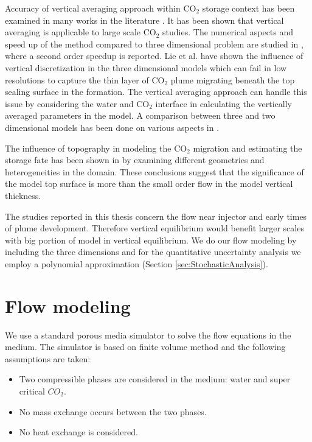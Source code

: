 Accuracy of vertical averaging approach within $\mbox{CO}_2$ storage context has
been
examined in many works in the literature
\cite{moll2011field,lie2010accurate,class2009benchmark,grayderivation}. It has
been shown that vertical averaging is applicable to large scale $\mbox{CO}_2$
studies. The numerical aspects and speed up of the method compared to three
dimensional problem are studied in
\cite{ligaarden2010numerical,grayderivation}, where a second order
speedup is reported. Lie et al. \cite{lie2010accurate} have shown the
influence of vertical discretization in the three dimensional models which can
fail in low resolutions to capture the thin layer of $\mbox{CO}_2$ plume
migrating beneath the top sealing surface in the formation. The vertical
averaging approach can handle this issue by considering the water and
$\mbox{CO}_2$ interface in calculating the vertically averaged parameters in the
model. A comparison between three and two dimensional models has been done on
various aspects in \cite{moll2011field}.

The influence of topography in modeling the $\mbox{CO}_2$ migration
and estimating the storage fate has been shown in
\cite{syversveenstudy,grayderivation} by examining different geometries and
heterogeneities in the domain. These conclusions suggest that the significance
of the model top surface is more than the small order flow in the model vertical
thickness.

The studies reported in this thesis concern the flow near injector and early
times of plume development. Therefore vertical equilibrium would benefit larger
scales with big portion of model in vertical equilibrium. We do our flow
modeling by including the three dimensions and for the quantitative uncertainty
analysis we employ a polynomial approximation (Section
\ref{sec:StochasticAnalysis}).

\section{Flow modeling}
\label{sec:FolowModeling}

We use a standard porous media simulator \cite{sis2007eclipse} to solve the flow equations in the
medium. The simulator is based on finite volume method and the following
assumptions are taken:

\begin{itemize}

  \item Two compressible phases are considered in the medium: water and super
critical ${CO}_2$.
  \item No mass exchange occurs between the two phases.
  \item No heat exchange is considered.
 
\end{itemize}

